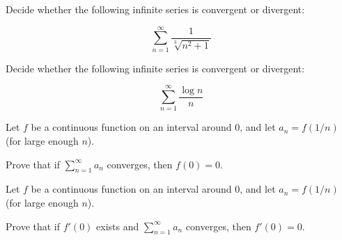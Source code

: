 \documentclass[12pt,letterpaper]{hmcpset}
\begin{document}
\begin{solution}

\end{solution}

\begin{problem}[23.1.vi]

Decide whether the following infinite series is convergent or divergent:

\[ \sum_{n=1}^{\infty} \dfrac{1}{\sqrt[3]{n^2+1}}\]

\end{problem}

\begin{solution}
\end{solution}

\begin{problem}[23.1.viii]

Decide whether the following infinite series is convergent or divergent:

\[ \sum_{n=1}^{\infty} \dfrac{\log{n}}{n}\]

\end{problem}

\begin{solution}
\end{solution}

\begin{problem}[23.6.a]

Let $f$ be a continuous function on an interval around 0, and let $a_n = f(1/n)$ (for large enough $n$).

Prove that if $\sum_{n=1}^{\infty} a_n$ converges, then $f(0) = 0$.

\end{problem}

\begin{solution}

\end{solution}

\begin{problem}[23.6.b]

Let $f$ be a continuous function on an interval around 0, and let $a_n = f(1/n)$ (for large enough $n$).

Prove that if $f'(0)$ exists and $\sum_{n=1}^{\infty} a_n$ converges, then $f'(0) = 0$.


\end{problem}

\begin{solution}

\end{solution}
\end{document}
